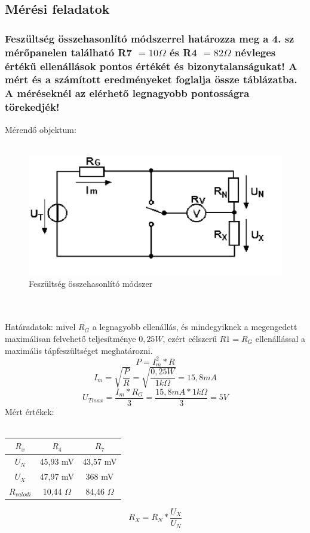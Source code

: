 \documentclass[10pt,a4paper]{article}
\begin{document}
	\subsection{Mérési feladatok}
		\subsubsection{Feszültség összehasonlító módszerrel határozza meg a 4. sz
mérőpanelen található R7 $= 10 \Omega $ és R4 $= 82 \Omega $ névleges értékű ellenállások pontos értékét és bizonytalanságukat!
A mért és a számított eredményeket foglalja össze táblázatba. A méréseknél
az elérhető legnagyobb pontosságra törekedjék!}
		Mérendő objektum:
		\\\\
		\begin{figure}[hbtp]
		\centering
		\includegraphics[scale=0.5]{teljes/fesz_ossze.png}
		\caption{Feszültség összehasonlító módszer}
		\end{figure}
		\\\\
		Határadatok: mivel $R_G$ a legnagyobb ellenállás, és mindegyiknek a megengedett maximálisan felvehető teljesítménye $0,25 W$, ezért célszerű $R1 = R_G$ ellenállással a maximális tápfeszültséget meghatározni.
		$$P = I^2_{m} * R$$
		$$I_m = \sqrt{\frac{P}{R}} = \sqrt{\frac{0,25W}{1k\Omega}} = 15,8 mA$$
		$$U_{Tmax} = \frac{I_m * R_G}{3} = \frac{15,8 mA * 1 k\Omega}{3} = 5 V$$
		Mért értékek:\\\\
		\begin{tabular}{|c|c|c|}
		\hline 
		$R_x$ & $R_4$ & $R_7$ \\ 
		\hline 
		$U_N$ & 45,93 mV & 43,57 mV \\ 
		\hline 
		$U_X$ & 47,97 mV & 368 mV \\ 
		\hline 
		$R_{valodi}$ & 10,44 $\Omega$ & 84,46 $\Omega$ \\ 
		\hline 
		\end{tabular} 
		$$R_X = R_N * \frac{U_X}{U_N}$$
		
\end{document}
